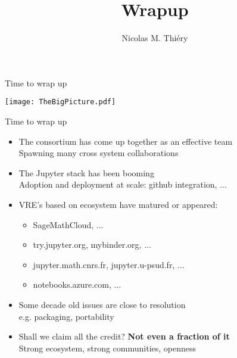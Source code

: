 \documentclass{beamer}
\author{Nicolas M. Thiéry}
\title{Wrapup}
\begin{document}
\begin{frame}{Time to wrap up}

  \hspace{-1cm}\texttt{[image: TheBigPicture.pdf]}
\end{frame}

\begin{frame}{Time to wrap up}
  \begin{itemize}
  \item The consortium has come up together as an effective team\\
    Spawning many cross system collaborations
    \pause\bigskip
  \item The Jupyter stack has been booming\\
    Adoption and deployment at scale: github integration, ...
    \pause\bigskip
  \item VRE's based on ecosystem have matured or appeared:
    \begin{itemize}
    \item SageMathCloud, ...
    \item try.jupyter.org, mybinder.org, ...
    \item jupyter.math.cnrs.fr, jupyter.u-psud.fr, ...
    \item notebooks.azure.com, ...
    \end{itemize}
    \pause\bigskip
  \item Some decade old issues are close to resolution\\
    e.g. packaging, portability
    \pause\bigskip
  \item Shall we claim all the credit? \pause \textbf{Not even a fraction of it}\\
    Strong ecosystem, strong communities, openness
  \end{itemize}
\end{frame}
\end{document}

